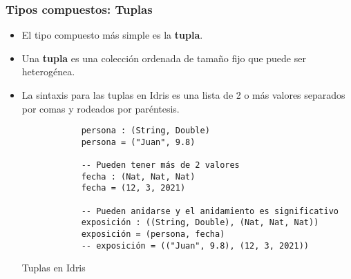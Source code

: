 \documentclass{beamer}
\begin{document}
\begin{frame}[fragile]
  \frametitle{Tipos compuestos: Tuplas}

  \begin{itemize}
    \item El tipo compuesto más simple es la \textbf{tupla}.
    \item Una \textbf{tupla} es una colección ordenada de tamaño fijo
      que puede ser heterogénea.
    \item La sintaxis para las tuplas en Idris es una lista de 2 o más valores
      separados por comas y rodeados por paréntesis.

    \begin{listing}[H]
      \begin{center}
        \begin{minipage}{0.7\textwidth}
            \begin{verbatim}
            persona : (String, Double)
            persona = ("Juan", 9.8)

            -- Pueden tener más de 2 valores
            fecha : (Nat, Nat, Nat)
            fecha = (12, 3, 2021)

            -- Pueden anidarse y el anidamiento es significativo
            exposición : ((String, Double), (Nat, Nat, Nat))
            exposición = (persona, fecha)
            -- exposición = (("Juan", 9.8), (12, 3, 2021))
            \end{verbatim}
        \end{minipage}
      \end{center}
      \caption{Tuplas en Idris}
      \label{lst:tupidris}
    \end{listing}
  \end{itemize}

\end{frame}
\end{document}
